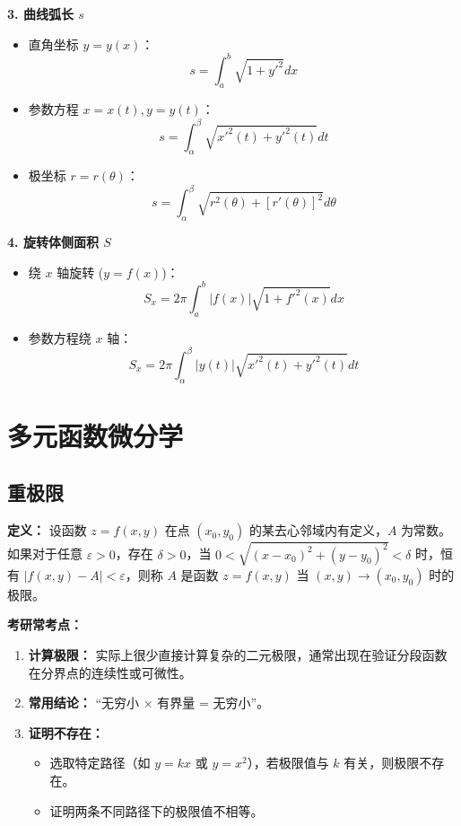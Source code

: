 \documentclass[a4paper,12pt]{ctexart}
\newenvironment{purplebox}
  {\begin{tcolorbox}[colback=white, colframe=boxpurple, boxrule=1pt, sharp corners, title=\textbf{定义/定理/核心公式}]}
  {\end{tcolorbox}}
\newenvironment{rednote}
  {\begin{tcolorbox}[colback=notepurple, colframe=highlightred, boxrule=1pt, title=\textbf{重点/技巧/手写笔记}]}
  {\end{tcolorbox}}
\begin{document}
\textbf{3. 曲线弧长 $s$}
\begin{itemize}
    \item 直角坐标 $y=y(x)$：
    \[ s = \int_a^b \sqrt{1+y'^2} dx \]
    \item 参数方程 $x=x(t), y=y(t)$：
    \[ s = \int_\alpha^\beta \sqrt{x'^2(t)+y'^2(t)} dt \]
    \item 极坐标 $r=r(\theta)$：
    \[ s = \int_\alpha^\beta \sqrt{r^2(\theta) + [r'(\theta)]^2} d\theta \]
\end{itemize}

\textbf{4. 旋转体侧面积 $S$}
\begin{itemize}
    \item 绕 $x$ 轴旋转 ($y=f(x)$)：
    \[ S_x = 2\pi \int_a^b |f(x)| \sqrt{1+f'^2(x)} dx \]
    \item 参数方程绕 $x$ 轴：
    \[ S_x = 2\pi \int_\alpha^\beta |y(t)| \sqrt{x'^2(t)+y'^2(t)} dt \]
\end{itemize}
\newpage

\section{多元函数微分学}

\subsection{重极限}

\begin{purplebox}
    \textbf{定义：} 设函数 $z=f(x,y)$ 在点 $(x_0,y_0)$ 的某去心邻域内有定义，$A$ 为常数。
    如果对于任意 $\varepsilon > 0$，存在 $\delta > 0$，当 $0 < \sqrt{(x-x_0)^2+(y-y_0)^2} < \delta$ 时，恒有 $|f(x,y) - A| < \varepsilon$，则称 $A$ 是函数 $z=f(x,y)$ 当 $(x,y) \to (x_0,y_0)$ 时的极限。
\end{purplebox}

\begin{rednote}
    \textbf{考研常考点：}
    \begin{enumerate}
        \item \textbf{计算极限：} 实际上很少直接计算复杂的二元极限，通常出现在验证分段函数在分界点的连续性或可微性。
        \item \textbf{常用结论：} “无穷小 $\times$ 有界量 = 无穷小”。
        \item \textbf{证明不存在：}
        \begin{itemize}
            \item 选取特定路径（如 $y=kx$ 或 $y=x^2$），若极限值与 $k$ 有关，则极限不存在。
            \item 证明两条不同路径下的极限值不相等。
        \end{itemize}
    \end{enumerate}
\end{rednote}
\end{document}
